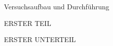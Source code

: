 \documentclass[pdftex, a4paper,11pt, twoside]{report}
\begin{document}
  \begin{chapter}{Versuchsaufbau und Durchführung}
    \label{chp:Aufbau}
    
    
    
    \begin{section}{ERSTER TEIL}
      \label{chp:Aufbau:sec:ERSTERTEIL}
      
      
      
      \begin{subsection}{ERSTER UNTERTEIL}
	\label{chp:Aufbau:sec:ERSTERTEIL:subsec:UNTERTEIL}
       
       
       
      \end{subsection}
      
      
    \end{section}
    
  \end{chapter}
  
  
  
\end{document}
